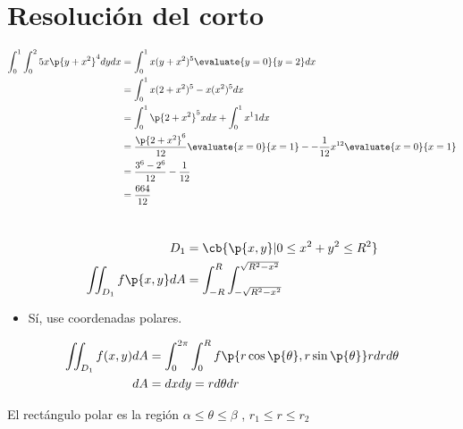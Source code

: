 \section{Resolución del corto}
\begin{center}
   \begin{align*}
        \int_{0}^{1}\int_{0}^{2}5x\p{y+x^2}^4 dydx &= \int_{0}^{1}x(y+x^2)^5 \evaluate{y=0}{y=2} dx \\ 
        &= \int_{0}^{1} x(2+x^2)^5-x(x^2)^5 dx \\ 
        &= \int_{0}^{1}\p{2+x^2} ^5xdx + \int_{0}^{1}x^11 dx \\ 
        &= \frac{\p{2+x^2} ^6}{12} \evaluate{x=0}{x=1} - - \frac{1}{12} x^{12} \evaluate{x=0}{x=1} \\ 
        &= \frac{3^6-2^6}{12} - \frac{1}{12} \\ 
        &= \frac{664}{12} \\  
   \end{align*}
\end{center}


\section{}
\begin{figure}[!htb]
    \centering
\end{figure}
\begin{center}
   \begin{align*}
        D_1 &= \cb{\p{x,y} | 0 \leq x^2+y^2 \leq R^2} \\ 
        \iint_{D_1}^{} f\p{x,y} dA &= \int_{-R}^{R} \int_{-\sqrt{R^2-x^2}}^{\sqrt{R^2-x^2}} \\ 
   \end{align*}
\end{center}
\begin{itemize}
    \item Sí, use coordenadas polares.
\end{itemize}
\begin{figure}[!htb]
    \centering
\end{figure}

\begin{center}
   \begin{align*}
       \iint_{D_1}^{}f(x,y)dA &= \int_{0}^{2\pi}\int_{0}^{R}f\p{r\cos\p{ \theta } ,r\sin\p{ \theta  } } r dr d\theta \\ 
        dA &= dxdy = rd\theta dr \\ 
   \end{align*}
\end{center}
El rectángulo polar es la región $\displaystyle \alpha \leq \theta \leq \beta$ , $\displaystyle r_1 \leq r \leq r_2$ 
\begin{figure}[!htb]
    \centering
\end{figure}

